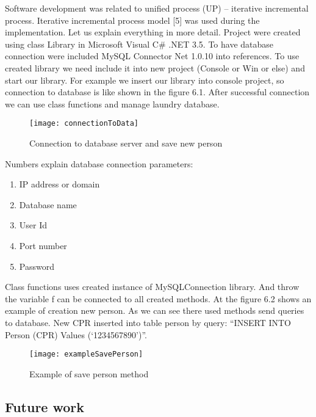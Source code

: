 Software development was related to unified process (UP) – iterative incremental process.  Iterative incremental process model [5] was used during the implementation.  
Let us explain everything in more detail. Project were created using class Library in Microsoft Visual C\# .NET 3.5. To have database connection were included MySQL Connector Net 1.0.10 into references. To use created library we need include it into new project (Console or Win or else) and start our library. For example we insert our library into console project, so connection to database is like shown in the figure 6.1. After successful connection we can use class functions and manage laundry database. 

\begin{figure}[h]
	\centering
		\texttt{[image: connectionToData]}
	\caption{Connection to database server and save new person}
	\label{fig:planning}
\end{figure}

Numbers explain database connection parameters:

\begin{enumerate}
	\item IP address or domain
	\item Database name
	\item User Id
	\item Port number
	\item Password
\end{enumerate}

Class functions uses created instance of MySQLConnection library. And throw the variable f can be connected to all created methods. At the figure 6.2 shows an example of creation new person. As we can see there used methods send queries to database. New CPR inserted into table person by query: “INSERT INTO Person (CPR) Values (‘1234567890’)”.

\begin{figure}[h]
	\centering
		\texttt{[image: exampleSavePerson]}
	\caption{Example of save person method}
	\label{fig:planning}
\end{figure}

\subsection{Future work}